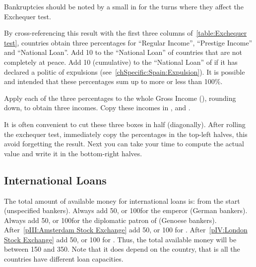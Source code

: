 \begin{playtip}
  Bankruptcies should be noted by a small \textetoile in  for the turns where they affect the Exchequer test.
\end{playtip}

\aparag[Percentages] By cross-referencing this result with the first three
columns of~\ref{table:Exchequer test}, countries obtain three percentages for
``Regular Income'', ``Prestige Income'' and ``National Loan''.
\bparag Add 10 to the ``National Loan'' of countries that are not completely
at peace.
\bparag Add 10 (cumulative) to the ``National Loan'' of \HIS if it has
declared a politic of expulsions (see~\ref{chSpecific:Spain:Expulsion}).
\bparag It is possible and intended that these percentages sum up to more or
less than 100\%.

\aparag[Incomes] Apply each of the three percentages to the whole Gross Income
(), rounding down, to obtain three incomes.
\bparag Copy these incomes in ,
 and .

\begin{playtip}
  It is often convenient to cut these three boxes in half (diagonally). After
  rolling the exchequer test, immediately copy the percentages in the top-left
  halves, this avoid forgetting the result. Next you can take your time to
  compute the actual value and write it in the bottom-right halves.
\end{playtip}


\subsection{International Loans}\label{chBudget:International loans}
 The total amount of available money for international
loans is:
\ducats from the start (unspecified bankers).
\bparag Always add 50\ducats, or 100\ducats for the emperor (German bankers).
\bparag Always add 50\ducats, or 100\ducats for the diplomatic patron of
\paysGenes (Genoese bankers).
\bparag After~\ref{pIII:Amsterdam Stock Exchange} add 50\ducats, or 100\ducats
for \HOL.
\bparag After~\ref{pIV:London Stock Exchange} add 50\ducats, or 100\ducats
for \ANG.
\bparag Thus, the total available money will be between 150 and
350\ducats. Note that it does depend on the country, that is all the countries
have different loan capacities.

